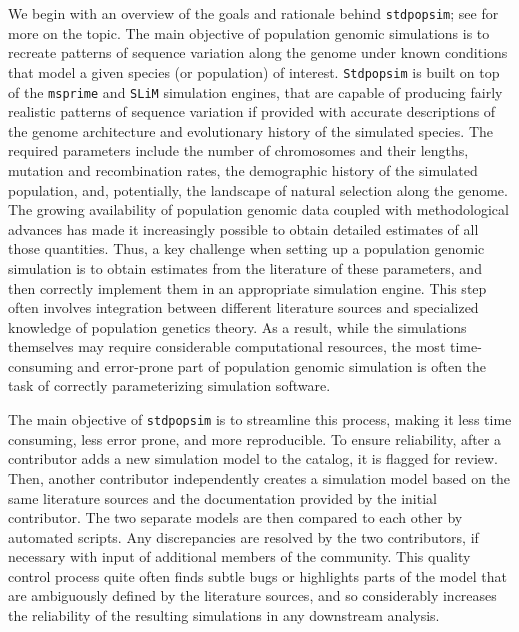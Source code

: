 \documentclass[hidelinks]{article}
\newcommand{\Stdpopsim}{\texttt{Stdpopsim}\xspace}
\newcommand{\stdpopsim}{\texttt{stdpopsim}\xspace}
\begin{document}
We begin with an overview of the goals and rationale behind \stdpopsim;
see \citet{Adrion2020} for more on the topic.
The main objective of population genomic simulations is to recreate 
patterns of sequence variation along the genome under known conditions
that model a given species (or population) of interest.
\Stdpopsim is built on top of the
\texttt{msprime} \citep{Kelleher2016,Nelson2020,Baumdicker2022}
and \texttt{SLiM} \citep{Haller2019} simulation engines,
that are capable of producing fairly realistic patterns of sequence variation
if provided with accurate descriptions of the genome architecture
and evolutionary history of the simulated species.
The required parameters include the number of chromosomes and their lengths,
mutation and recombination rates, the demographic history of the simulated population,
and, potentially, the landscape of natural selection along the genome.
The growing availability of population genomic data coupled with methodological advances
has made it increasingly possible to obtain detailed estimates of all those quantities.
Thus, a key challenge when setting up a population genomic simulation is to
obtain estimates from the literature of these parameters,
and then correctly implement them in an appropriate simulation engine.
This step often involves integration between different literature sources and
specialized knowledge of population genetics theory.
As a result, while the simulations themselves may require considerable computational resources,
the most time-consuming and error-prone part of population genomic simulation is
often the task of correctly parameterizing simulation software.

The main objective of \stdpopsim is to streamline this process,
making it less time consuming, less error prone, and more reproducible.
To ensure reliability,
after a contributor adds a new simulation model to the catalog, it is flagged for review.
Then, another contributor independently creates a simulation model
based on the same literature sources and the documentation provided by the initial contributor.
The two separate models are then compared to each other by automated scripts.
Any discrepancies are resolved by the two contributors,
if necessary with input of additional members of the community.
This quality control process quite often finds subtle bugs \citep[e.g., as in][]{Ragsdale2020}
or highlights parts of the model that are ambiguously defined by the literature sources,
and so considerably increases the reliability of the resulting simulations in any downstream analysis.
\end{document}
